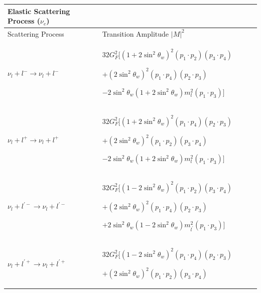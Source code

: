 \begin{table}[ht]
\centering
\begin{tabular}{lp{8cm}lp{8cm}l}
\hline\hline
Elastic Scattering Process ($\nu_e$) \\
\hline\hline
Scattering Process & Transition Amplitude $|M|^2$\\
\hline
$\nu_l+l^-\longrightarrow\nu_l+l^-$ & 
$ 32G^2_F\bigg[
   \left(1+2\sin^2\theta_w\right)^2\left(p_1\cdot p_2\right)\left(p_3\cdot p_4\right)$
   
   $+\left(2\sin^2\theta_w\right)^2\left(p_1\cdot p_4\right)\left(p_2\cdot p_3\right)$
   
   $-2\sin^2\theta_w\left(1+2\sin^2\theta_w\right)m^2_l\left(p_1\cdot p_3\right)\bigg]$ \\
\hline
$\nu_l+l^+\longrightarrow\nu_l+l^+$ &
$ 32G^2_F\bigg[
   \left(1+2\sin^2\theta_w\right)^2\left(p_1\cdot p_4\right)\left(p_2\cdot p_3\right)$
   
   $+\left(2\sin^2\theta_w\right)^2\left(p_1\cdot p_2\right)\left(p_3\cdot p_4\right)$
   
   $-2\sin^2\theta_w\left(1+2\sin^2\theta_w\right)m^2_l\left(p_1\cdot p_3\right)\bigg]$ \\
\hline
$\nu_l+l^{\prime-}\longrightarrow\nu_l+l^{\prime-}$ &
$ 32G^2_F\bigg[
   \left(1-2\sin^2\theta_w\right)^2\left(p_1\cdot p_2\right)\left(p_3\cdot p_4\right)$
   
  $+\left(2\sin^2\theta_w\right)^2\left(p_1\cdot p_4\right)\left(p_2\cdot p_3\right)$
  
  $+2\sin^2\theta_w\left(1-2\sin^2\theta_w\right)m^2_{l^\prime}\left(p_1\cdot p_3\right)\bigg]$ \\
\hline
$\nu_l+l^{\prime+}\longrightarrow\nu_l+l^{\prime+}$ &
$ 32G^2_F\bigg[
   \left(1-2\sin^2\theta_w\right)^2\left(p_1\cdot p_4\right)\left(p_2\cdot p_3\right)$
   
   $+\left(2\sin^2\theta_w\right)^2\left(p_1\cdot p_2\right)\left(p_3\cdot p_4\right)$
   

\end{tabular}
\end{table}
